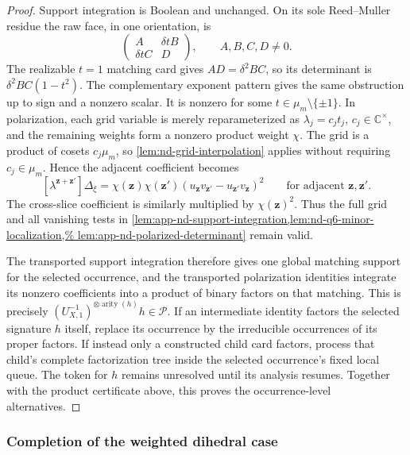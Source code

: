 \documentclass[11pt,letterpaper,onecolumn]{article}
\theoremstyle{plain}
\theoremstyle{definition}
\theoremstyle{remark}
\newcommand{\cP}{\mathscr P}
\newcommand{\arity}{\operatorname{arity}}
\begin{document}
\begin{proof}
Support integration is Boolean and unchanged.  On its sole Reed--Muller
residue the raw face, in one orientation, is
\[
 \begin{pmatrix}A&\delta tB\\\delta tC&D\end{pmatrix},
 \qquad A,B,C,D\ne0.
\]
The realizable \(t=1\) matching card gives \(AD=\delta^2BC\), so its
determinant is \(\delta^2BC(1-t^2)\).  The complementary exponent pattern
gives the same obstruction up to sign and a nonzero scalar.  It is nonzero
for some \(t\in \mu_m\setminus\{\pm1\}\).  In polarization,
each grid variable is merely reparameterized as
\(\lambda_j=c_jt_j\), \(c_j\in\mathbb C^\times\), and the remaining weights form
a nonzero product weight \(\chi\).  The grid is a product of cosets
\(c_j\mu_m\), so \cref{lem:nd-grid-interpolation} applies without requiring
\(c_j\in \mu_m\).  Hence the adjacent coefficient becomes
\[
 [\lambda^{{\mathbf z}+{\mathbf z}'}]\Delta_\xi
 =\chi({\mathbf z})\chi({\mathbf z}')(u_{\mathbf z}v_{{\mathbf z}'}-u_{{\mathbf z}'}v_{\mathbf z})^2
 \qquad\text{for adjacent }{\mathbf z},{\mathbf z}'.
\]
The cross-slice coefficient is similarly multiplied by \(\chi({\mathbf z})^2\).
Thus the full grid and all vanishing tests in
\cref{lem:app-nd-support-integration,lem:nd-q6-minor-localization,%
lem:app-nd-polarized-determinant}
remain valid.

The transported support integration therefore gives one global matching
support for the selected occurrence, and the transported polarization
identities integrate its nonzero coefficients into a product of binary
factors on that matching.  This is precisely
\((U_{X,1}^{-1})^{\otimes\arity(h)}h\in\cP\).
If an intermediate identity factors the selected signature \(h\) itself,
replace its occurrence by the irreducible occurrences of its proper
factors.  If instead only a constructed child card factors, process that
child's complete factorization tree inside the selected occurrence's fixed
local queue. The token for \(h\) remains unresolved until its analysis
resumes.  Together with the
product certificate above, this proves the occurrence-level alternatives.
\end{proof}



\subsubsection{Completion of the weighted dihedral case}
\end{document}

